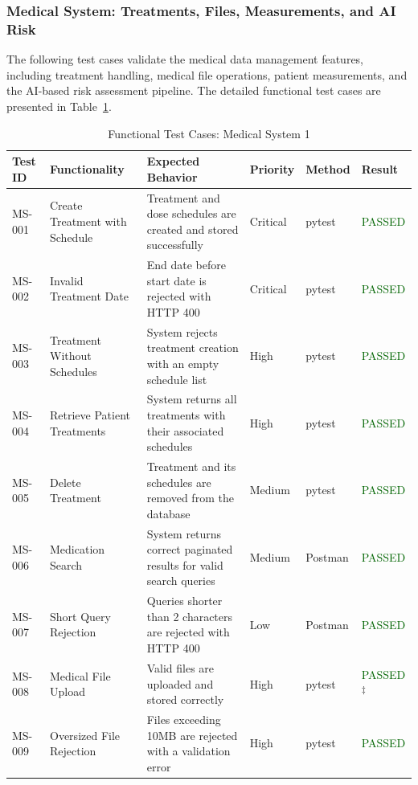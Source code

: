 \subsubsection{Medical System: Treatments, Files, Measurements, and AI Risk}
The following test cases validate the medical data management features, including treatment handling, medical file operations, patient measurements, and the AI-based risk assessment pipeline. The detailed functional test cases are presented in Table~\ref{tab:medical_system_1}.
\begin{table}[ht!]
\centering
\caption{Functional Test Cases: Medical System 1}
\label{tab:medical_system_1}
\renewcommand{\arraystretch}{1.4}
\begin{tabular}{|p{1.6cm}|p{3cm}|p{3.8cm}|p{1.6cm}|p{1.6cm}|p{1.7cm}|}
\hline
\rowcolor{red!10}
\textbf{Test ID} & \textbf{Functionality} & \textbf{Expected Behavior} & \textbf{Priority} & \textbf{Method} & \textbf{Result} \\
\hline
MS-001 & Create Treatment with Schedule & Treatment and dose schedules are created and stored successfully & Critical & pytest & \textcolor{darkgreen}{PASSED} \\
\hline
MS-002 & Invalid Treatment Date & End date before start date is rejected with HTTP 400 & Critical & pytest & \textcolor{darkgreen}{PASSED} \\
\hline
MS-003 & Treatment Without Schedules & System rejects treatment creation with an empty schedule list & High & pytest & \textcolor{darkgreen}{PASSED} \\
\hline
MS-004 & Retrieve Patient Treatments & System returns all treatments with their associated schedules & High & pytest & \textcolor{darkgreen}{PASSED} \\
\hline
MS-005 & Delete Treatment & Treatment and its schedules are removed from the database & Medium & pytest & \textcolor{darkgreen}{PASSED} \\
\hline
MS-006 & Medication Search & System returns correct paginated results for valid search queries & Medium & Postman & \textcolor{darkgreen}{PASSED} \\
\hline
MS-007 & Short Query Rejection & Queries shorter than 2 characters are rejected with HTTP 400 & Low & Postman & \textcolor{darkgreen}{PASSED} \\
\hline
MS-008 & Medical File Upload & Valid files are uploaded and stored correctly & High & pytest & \textcolor{darkgreen}{PASSED}\textsuperscript{$\ddagger$}\\
\hline
MS-009 & Oversized File Rejection & Files exceeding 10MB are rejected with a validation error & High & pytest & \textcolor{darkgreen}{PASSED} \\
\hline
\end{tabular}
\end{table}

